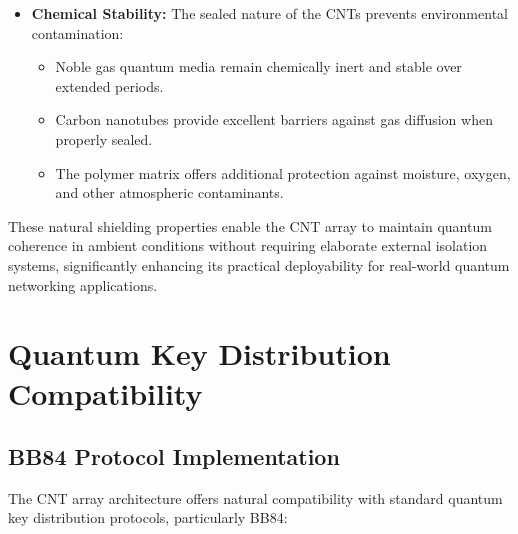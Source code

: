 \documentclass[11pt]{article}
\begin{document}
\begin{itemize}
		\item \textbf{Chemical Stability:} The sealed nature of the CNTs prevents environmental contamination:
		\begin{itemize}
			\item Noble gas quantum media remain chemically inert and stable over extended periods.
			\item Carbon nanotubes provide excellent barriers against gas diffusion when properly sealed.
			\item The polymer matrix offers additional protection against moisture, oxygen, and other atmospheric contaminants.
		\end{itemize}
	\end{itemize}
	
	These natural shielding properties enable the CNT array to maintain quantum coherence in ambient conditions without requiring elaborate external isolation systems, significantly enhancing its practical deployability for real-world quantum networking applications.
	
	\section{Quantum Key Distribution Compatibility}
	\subsection{BB84 Protocol Implementation}
	The CNT array architecture offers natural compatibility with standard quantum key distribution protocols, particularly BB84:
	
\end{document}
